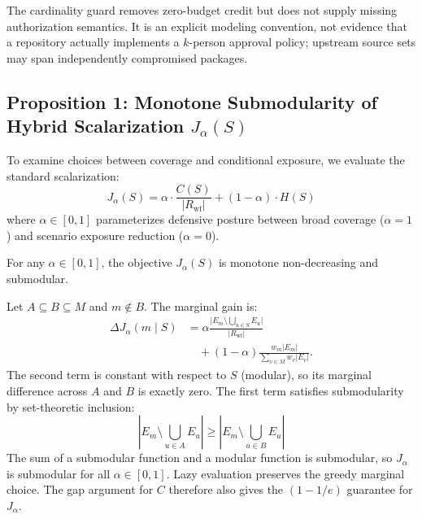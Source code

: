 The cardinality guard removes zero-budget credit but does not supply missing authorization semantics. It is an explicit modeling convention, not evidence that a repository actually implements a $k$-person approval policy; upstream source sets may span independently compromised packages.

\subsection{Proposition 1: Monotone Submodularity of Hybrid Scalarization $J_\alpha(S)$}
To examine choices between coverage and conditional exposure, we evaluate the standard scalarization:
\begin{equation}
J_\alpha(S) = \alpha \cdot \frac{C(S)}{|R_{\text{wf}}|} + (1 - \alpha) \cdot H(S)
\end{equation}
where $\alpha \in [0, 1]$ parameterizes defensive posture between broad coverage ($\alpha = 1$) and scenario exposure reduction ($\alpha = 0$).

\begin{proposition}
For any $\alpha \in [0, 1]$, the objective $J_\alpha(S)$ is monotone non-decreasing and submodular.
\end{proposition}
\begin{IEEEproof}
Let $A \subseteq B \subseteq M$ and $m \notin B$. The marginal gain is:
\begin{equation}
\begin{aligned}
\Delta J_\alpha(m \mid S)
  &= \alpha \frac{\bigl\lvert E_m \setminus \bigcup_{u\in S} E_u\bigr\rvert}
                  {\lvert R_{\text{wf}}\rvert} \\
  &\quad + (1-\alpha)\frac{w_m\lvert E_m\rvert}
                           {\sum_{v\in M} w_v\lvert E_v\rvert} .
\end{aligned}
\end{equation}
The second term is constant with respect to $S$ (modular), so its marginal difference across $A$ and $B$ is exactly zero. The first term satisfies submodularity by set-theoretic inclusion:
\begin{equation}
|E_m \setminus \bigcup_{u \in A} E_u| \ge |E_m \setminus \bigcup_{u \in B} E_u|
\end{equation}
The sum of a submodular function and a modular function is submodular, so $J_\alpha$ is submodular for all $\alpha\in[0,1]$. Lazy evaluation preserves the greedy marginal choice. The gap argument for $C$ therefore also gives the $(1-1/e)$ guarantee for $J_\alpha$.
\end{IEEEproof}

